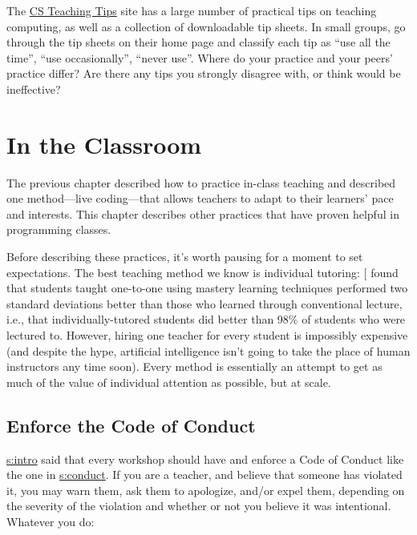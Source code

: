 The \href{http://csteachingtips.org/}{CS Teaching Tips} site has a large number of
practical tips on teaching computing, as well as a collection of
downloadable tip sheets. In small groups, go through the tip sheets on
their home page and classify each tip as ``use all the time'', ``use
occasionally'', ``never use''. Where do your practice and your peers'
practice differ? Are there any tips you strongly disagree with, or
think would be ineffective?

\chapter{In the Classroom}\label{s:classroom}

The previous chapter described how to practice in-class teaching and
described one method---live coding---that allows teachers to adapt to their
learners' pace and interests. This chapter describes other practices
that have proven helpful in programming classes.

Before describing these practices, it's worth pausing for a moment to
set expectations. The best teaching method we know is individual
tutoring: {[}\protect[\hyperlink{b:Bloo1984}{Bloo1984}]{]} found that students taught one-to-one using
mastery learning techniques performed two standard deviations better
than those who learned through conventional lecture, i.e., that
individually-tutored students did better than 98\% of students who were
lectured to. However, hiring one teacher for every student is impossibly
expensive (and despite the hype, artificial intelligence isn't going to
take the place of human instructors any time soon). Every method is
essentially an attempt to get as much of the value of individual
attention as possible, but at scale.

\section{Enforce the Code of Conduct}\label{s:classroom-enforce}

\protect\hyperlink{CHAPTER}{s:intro} said that every workshop should have and enforce a
Code of Conduct like the one in \protect\hyperlink{APPENDIX}{s:conduct}. If you are a
teacher, and believe that someone has violated it, you may warn them,
ask them to apologize, and/or expel them, depending on the severity of
the violation and whether or not you believe it was intentional.
Whatever you do:


